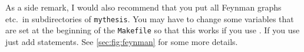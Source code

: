 As a side remark, I would also recommend that you put all Feynman
graphs etc.\ in subdirectories of \texttt{mythesis}. You may have to
change some variables that are set at the beginning of the
\texttt{Makefile} so that this works if you use . If
you use  just add  statements.
See \cref{sec:fig:feynman} for some more details.
